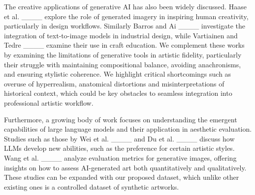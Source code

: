 The creative applications of generative AI has also been widely discussed. Haase et al. ____ explore the role of generated imagery in inspiring human creativity, particularly in design workflows. Similarly Barros and Ai ____ investigate the integration of text-to-image models in industrial design, while Vartiainen and Tedre ____ examine their use in craft education. We complement these works by examining the limitations of generative tools in artistic fidelity, particularly their struggle with maintaining compositional balance, avoiding anachronisms, and ensuring stylistic coherence. We highlight critical shortcomings such as overuse of hyperrealism, anatomical distortions and misinterpretations of historical context, which could be key obstacles to seamless integration into professional artistic workflow.  

Furthermore, a growing body of work focuses on understanding the emergent capabilities of large language models and their application in aesthetic evaluation. Studies such as those by Wei et al. ____ and Du et al. ____ discuss how LLMs develop new abilities, such as the preference for certain artistic styles. Wang et al. ____ analyze evaluation metrics for generative images, offering insights on how to assess AI-generated art both quantitatively and qualitatively. These studies can be expanded with our proposed dataset, which unlike other existing ones is a controlled dataset of synthetic artworks.
